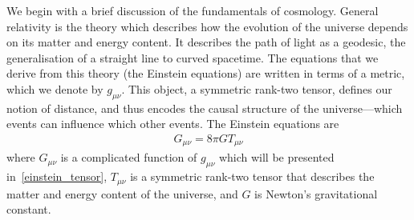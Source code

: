     We begin with a brief discussion of the fundamentals of cosmology.
    General relativity is the theory which describes how the evolution of the universe depends
    on its matter and energy content. It describes the path of light as a geodesic,
    the generalisation of a straight line to curved spacetime.
    The equations that we derive from this theory (the Einstein equations) are written in terms of a metric,
    which we denote by $g_{\mu\nu}$. This object, a symmetric rank-two tensor,
    defines our notion of distance, and thus encodes
    the causal structure of the universe---which events can influence which other events.
    The Einstein equations are
    \begin{align}\label{einstein_equations}
        G_{\mu\nu} = 8\pi G T_{\mu\nu}
    \end{align}
    where $G_{\mu\nu}$ is a complicated function of $g_{\mu\nu}$ which
    will be presented in~\eqref{einstein_tensor},
    $T_{\mu\nu}$ is a symmetric rank-two tensor that describes the matter
    and energy content of the universe,
    and $G$ is Newton's gravitational constant.


